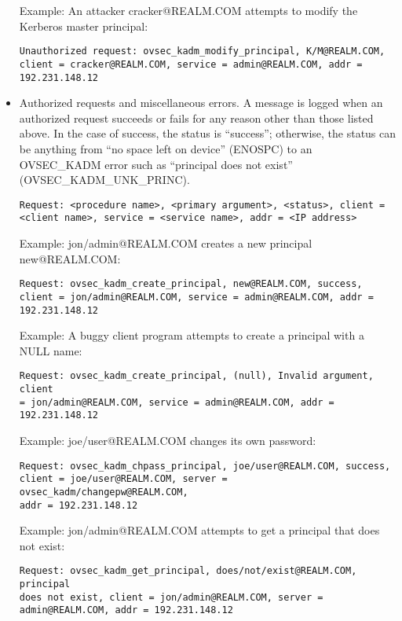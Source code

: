 \begin{itemize}
Example: An attacker cracker@REALM.COM attempts to modify the Kerberos
master principal:

\begin{verbatim}
Unauthorized request: ovsec_kadm_modify_principal, K/M@REALM.COM,
client = cracker@REALM.COM, service = admin@REALM.COM, addr =
192.231.148.12
\end{verbatim}

\item Authorized requests and miscellaneous errors.  A message is
logged when an authorized request succeeds or fails for any reason
other than those listed above.  In the case of success, the status is
``success''; otherwise, the status can be anything from ``no space
left on device'' (ENOSPC) to an OVSEC_KADM error such as ``principal
does not exist'' (OVSEC_KADM_UNK_PRINC).

\begin{verbatim}
Request: <procedure name>, <primary argument>, <status>, client =
<client name>, service = <service name>, addr = <IP address>
\end{verbatim}

Example: jon/admin@REALM.COM creates a new principal new@REALM.COM:

\begin{verbatim}
Request: ovsec_kadm_create_principal, new@REALM.COM, success,
client = jon/admin@REALM.COM, service = admin@REALM.COM, addr =
192.231.148.12
\end{verbatim}

Example: A buggy client program attempts to create a principal with a
NULL name:

\begin{verbatim}
Request: ovsec_kadm_create_principal, (null), Invalid argument, client
= jon/admin@REALM.COM, service = admin@REALM.COM, addr =
192.231.148.12
\end{verbatim}

Example: joe/user@REALM.COM changes its own password:

\begin{verbatim}
Request: ovsec_kadm_chpass_principal, joe/user@REALM.COM, success,
client = joe/user@REALM.COM, server = ovsec_kadm/changepw@REALM.COM,
addr = 192.231.148.12
\end{verbatim}

Example: jon/admin@REALM.COM attempts to get a principal that does not
exist:

\begin{verbatim}
Request: ovsec_kadm_get_principal, does/not/exist@REALM.COM, principal
does not exist, client = jon/admin@REALM.COM, server =
admin@REALM.COM, addr = 192.231.148.12
\end{verbatim}

\end{itemize}

